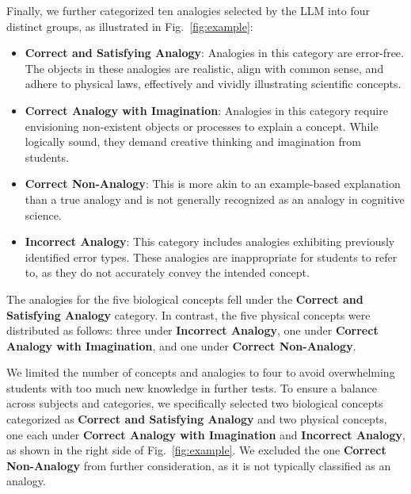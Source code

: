 
Finally, we further categorized ten analogies selected by the LLM into four distinct groups, as illustrated in Fig.~\ref{fig:example}:
\begin{itemize}
    \item \textbf{Correct and Satisfying Analogy}: Analogies in this category are error-free. 
    The objects in these analogies are realistic, align with common sense, and adhere to physical laws, effectively and vividly illustrating scientific concepts.
    \item \textbf{Correct Analogy with Imagination}: Analogies in this category require envisioning non-existent objects or processes to explain a concept. While logically sound, they demand creative thinking and imagination from students.
    \item \textbf{Correct Non-Analogy}: This is more akin to an example-based explanation than a true analogy and is not generally recognized as an analogy in cognitive science.
    \item \textbf{Incorrect Analogy}: This category includes analogies exhibiting previously identified error types. 
    These analogies are inappropriate for students to refer to, as they do not accurately convey the intended concept.
\end{itemize}


The analogies for the five biological concepts fell under the \textbf{Correct and Satisfying Analogy} category. 
In contrast, the five physical concepts were distributed as follows: three under \textbf{Incorrect Analogy}, one under \textbf{Correct Analogy with Imagination}, and one under \textbf{Correct Non-Analogy}.

We limited the number of concepts and analogies to four to avoid overwhelming students with too much new knowledge in further tests. 
To ensure a balance across subjects and categories, we specifically selected two biological concepts categorized as \textbf{Correct and Satisfying Analogy} and two physical concepts, one each under  \textbf{Correct Analogy with Imagination} and \textbf{Incorrect Analogy}, as shown in the right side of Fig.~\ref{fig:example}.
We excluded the one \textbf{Correct Non-Analogy} from further consideration, as it is not typically classified as an analogy.


